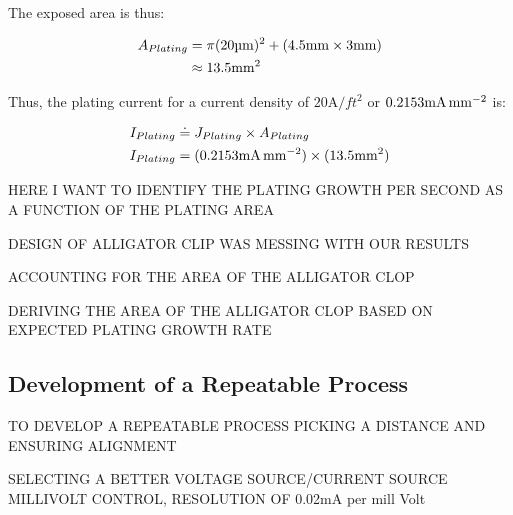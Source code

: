 The exposed area is thus:

\begin{equation}\notag
    \begin{split}
        A_{Plating} &= \pi (20 \um)^2 + (4.5 \mm \times 3 \mm) \\
        &\approx 13.5 \sqmm
    \end{split}
\end{equation}

Thus, the plating current for a current density of $20\unit{\ampere\per ft^2}$ or $0.2153 \junits$ is:

\begin{equation}\notag
    \begin{split}
        I_{Plating} &\doteq J_{Plating} \times A_{Plating} \\
        I_{Plating} &= (0.2153 \junits) \times (13.5 \sqmm)
    \end{split}
\end{equation}


HERE I WANT TO IDENTIFY THE PLATING GROWTH PER SECOND AS A FUNCTION OF THE PLATING AREA

DESIGN OF ALLIGATOR CLIP WAS MESSING WITH OUR RESULTS

ACCOUNTING FOR THE AREA OF THE ALLIGATOR CLOP

DERIVING THE AREA OF THE ALLIGATOR CLOP BASED ON EXPECTED PLATING GROWTH RATE



\subsection{Development of a Repeatable Process}

TO DEVELOP A REPEATABLE PROCESS PICKING A DISTANCE AND ENSURING ALIGNMENT

SELECTING A BETTER VOLTAGE SOURCE/CURRENT SOURCE MILLIVOLT CONTROL, RESOLUTION OF 0.02mA per mill Volt

